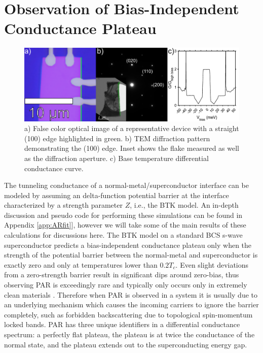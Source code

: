 \section{Observation of Bias-Independent Conductance Plateau}
\begin{figure}
	\centering
	\includegraphics[width = \textwidth]{Chap4/Figures/DeviceFab.pdf}
	\caption{a) False color optical image of a representative device with a straight (100) edge highlighted in green. b) \ac{TEM} diffraction pattern demonstrating the (100) edge. Inset shows the flake measured as well as the diffraction aperture. c) Base temperature differential conductance curve.}
	\label{fig:PARDeviceFab}
\end{figure}
The tunneling conductance of a normal-metal/superconductor interface can be modeled by assuming an delta-function potential barrier at the interface characterized by a strength parameter $Z$, i.e., the \ac{BTK} model. An in-depth discussion and pseudo code for performing these simulations can be found in Appendix \ref{app:ARfit}], however we will take some of the main results of these calculations for discussions here. The \ac{BTK} model on a standard \ac{BCS} s-wave superconductor predicts a bias-independent conductance plateau only when the strength of the potential barrier between the normal-metal and superconductor is exactly zero and only at temperatures lower than $0.2T_{c}$. Even slight deviations from a zero-strength barrier result in significant dips around zero-bias, thus observing \ac{PAR} is exceedingly rare and typically only occurs only in extremely clean materials \cite{Lee2019, Soulen85}. Therefore when \ac{PAR} is observed in a system it is usually due to an underlying mechanism which causes the incoming carriers to ignore the barrier completely, such as forbidden backscattering due to topological spin-momentum locked bands\cite{Lee2019,Young2009}. \ac{PAR} has three unique identifiers in a differential conductance spectrum: a perfectly flat plateau, the plateau is at twice the conductance of the normal state, and the plateau extends out to the superconducting energy gap.\par
